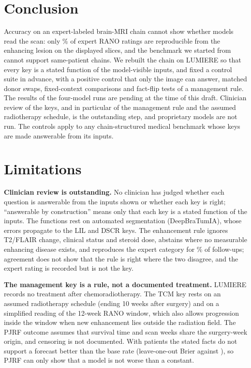 \documentclass[11pt]{article}
\begin{document}
\section{Conclusion}
\label{sec:conclusion}

Accuracy on an expert-labeled brain-MRI chain cannot show whether models read the scan: only \vfourConcordantPct{}\% of expert RANO ratings are reproducible from the enhancing lesion on the displayed slices, and the benchmark we started from cannot support same-patient chains. We rebuilt the chain on LUMIERE so that every key is a stated function of the model-visible inputs, and fixed a control suite in advance, with a positive control that only the image can answer, matched donor swaps, fixed-context comparisons and fact-flip tests of a management rule. \ifnum{} The results of the four-model runs are pending at the time of this draft. \fi Clinician review of the keys, and in particular of the management rule and the assumed radiotherapy schedule, is the outstanding step, and proprietary models are not run. The controls apply to any chain-structured medical benchmark whose keys are made answerable from its inputs.


\section*{Limitations}
\label{sec:limitations}

\textbf{Clinician review is outstanding.} No clinician has judged whether each question is answerable from the inputs shown or whether each key is right; ``answerable by construction'' means only that each key is a stated function of the inputs. The functions rest on automated segmentation (DeepBraTumIA), whose errors propagate to the LIL and DSCR keys. The enhancement rule ignores T2/FLAIR change, clinical status and steroid dose, abstains where no measurable enhancing disease exists, and reproduces the expert category for \vfourConcordantPct{}\% of follow-ups; agreement does not show that the rule is right where the two disagree, and the expert rating is recorded but is not the key.

\textbf{The management key is a rule, not a documented treatment.} LUMIERE records no treatment after chemoradiotherapy. The TCM key rests on an assumed radiotherapy schedule (ending 10 weeks after surgery) and on a simplified reading of the 12-week RANO window, which also allows progression inside the window when new enhancement lies outside the radiation field. The PJRF outcome assumes that survival time and scan weeks share the surgery-week origin, and censoring is not documented. With \vfourPjrfN{} patients the stated facts do not support a forecast better than the base rate (leave-one-out Brier \vfourPjrfBrierLR{} against \vfourPjrfBrierBase{}), so PJRF can only show that a model is not worse than a constant.
\end{document}
